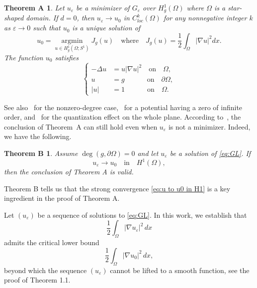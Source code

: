 \documentclass[a4paper,10pt,reqno]{amsart}
\newtheorem*{thma}{Theorem A}
\newtheorem*{thmb}{Theorem B}
\theoremstyle{definition}
\DeclareMathOperator{\argmin}{argmin}
\newcommand{\ve}{{\varepsilon}}
\newcommand{\Om}{{\Omega}}
\newcommand{\pa}{\partial}
\newcommand{\qin}{{\quad \mbox{in} \quad}}
\newcommand{\qon}{{\quad \mbox{on} \quad}}
\newcommand{\qwhere}{{\quad \mbox{where} \quad}}
\numberwithin{equation}{section}
\begin{document}
\begin{thma}{\rm \cite{BBH93}}\label{thma:BBH}
Let $u_{\ve}$ be a minimizer of $G_{\ve}$ over $H^1_g (\Om)$ where $\Om$ is  a star-shaped domain. 
If $d=0$, then $u_{\ve} \to u_{0}$ in $C^k_{loc} (\Om)$ for any nonnegative integer $k$ as $\ve \to 0$ such that $u_0$ is a unique solution of
\begin{equation}
\label{eq:u0 ftnal}
u_0 = \underset{u \in H^1_g (\Om;S^1)}{\argmin} J_g(u) \qwhere  J_g(u) = \frac{1}{2}\int_\Om | \nabla u |^2dx .
\end{equation}
The function $u_0$ satisfies
\begin{equation}
\label{eq:u0 GL}\left\{
\begin{aligned}
-\Delta u& = u |\nabla u|^2 \quad \text{on}\quad \Om,\\
u&=g  \qquad~\qon \pa\Omega, \\
|u|&=1\qquad ~ \qon \Om.
\end{aligned}
\right.
\end{equation}
\end{thma}
\medskip

See also~\cite{BBH94} for the nonzero-degree case,~\cite{HaSh06} for a potential having a zero of infinite order, and~\cite{BMR94} for the quantization effect on the whole plane.  
According to~\cite[Remark~A.1]{BBH94}, the conclusion of Theorem~A can still hold even when $u_\ve$ is not a minimizer.  
Indeed, we have the following.
 

\smallskip
\begin{thmb}{\rm \cite[p.144]{BBH94}}\label{thmb:BBH-Rmk}
Assume $\deg (g,\pa \Om)=0$ and let  $u_{\ve}$ be a solution of  \eqref{eq:GL}.
If
\begin{equation}\label{eq:u to u0 in H1}
u_\ve \to u_0 \qin  H^1(\Om),
\end{equation}
then the conclusion of Theorem A is valid.
\end{thmb}

Theorem B tells us that the strong convergence \eqref{eq:u to u0 in H1} is a key ingredient in the proof of Theorem A.

Let $(u_\varepsilon)$ be a sequence of solutions to \eqref{eq:GL}. 
In this work, we establish that 
\[
\frac{1}{2} \int_\Omega |\nabla u_\varepsilon|^2 \, dx 
\]
admits the critical lower bound 
\[
\frac{1}{2} \int_\Omega |\nabla u_0|^2 \, dx,
\]
beyond which the sequence $(u_\varepsilon)$ cannot be lifted to a smooth function, see the proof of Theorem 1.1.
\end{document}
